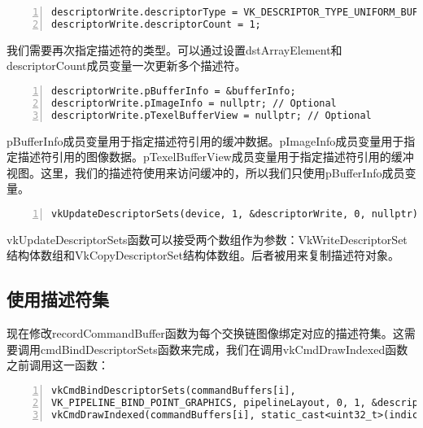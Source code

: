 \documentclass{ctexart}
\begin{document}
\begin{lstlisting}[language={[ANSI]C},keywordstyle=\color{blue!70},commentstyle=\color{red!50!green!50!blue!50},frame=shadowbox, rulesepcolor=\color{red!20!green!20!blue!20},basicstyle=\small,numbers=left, numberstyle=\tiny,breaklines=true]
descriptorWrite.descriptorType = VK_DESCRIPTOR_TYPE_UNIFORM_BUFFER;
descriptorWrite.descriptorCount = 1;
\end{lstlisting}

我们需要再次指定描述符的类型。可以通过设置dstArrayElement和descriptorCount成员变量一次更新多个描述符。

\begin{lstlisting}[language={[ANSI]C},keywordstyle=\color{blue!70},commentstyle=\color{red!50!green!50!blue!50},frame=shadowbox, rulesepcolor=\color{red!20!green!20!blue!20},basicstyle=\small,numbers=left, numberstyle=\tiny,breaklines=true]
descriptorWrite.pBufferInfo = &bufferInfo;
descriptorWrite.pImageInfo = nullptr; // Optional
descriptorWrite.pTexelBufferView = nullptr; // Optional
\end{lstlisting}

pBufferInfo成员变量用于指定描述符引用的缓冲数据。pImageInfo成员变量用于指定描述符引用的图像数据。pTexelBufferView成员变量用于指定描述符引用的缓冲视图。这里，我们的描述符使用来访问缓冲的，所以我们只使用pBufferInfo成员变量。

\begin{lstlisting}[language={[ANSI]C},keywordstyle=\color{blue!70},commentstyle=\color{red!50!green!50!blue!50},frame=shadowbox, rulesepcolor=\color{red!20!green!20!blue!20},basicstyle=\small,numbers=left, numberstyle=\tiny,breaklines=true]
vkUpdateDescriptorSets(device, 1, &descriptorWrite, 0, nullptr);
\end{lstlisting}

vkUpdateDescriptorSets函数可以接受两个数组作为参数：VkWriteDescriptorSet结构体数组和VkCopyDescriptorSet结构体数组。后者被用来复制描述符对象。

\subsection{使用描述符集}

现在修改recordCommandBuffer函数为每个交换链图像绑定对应的描述符集。这需要调用cmdBindDescriptorSets函数来完成，我们在调用vkCmdDrawIndexed函数之前调用这一函数：

\begin{lstlisting}[language={[ANSI]C},keywordstyle=\color{blue!70},commentstyle=\color{red!50!green!50!blue!50},frame=shadowbox, rulesepcolor=\color{red!20!green!20!blue!20},basicstyle=\small,numbers=left, numberstyle=\tiny,breaklines=true]
vkCmdBindDescriptorSets(commandBuffers[i],
VK_PIPELINE_BIND_POINT_GRAPHICS, pipelineLayout, 0, 1, &descriptorSets[i], 0, nullptr);
vkCmdDrawIndexed(commandBuffers[i], static_cast<uint32_t>(indices.size()), 1, 0, 0, 0);
\end{lstlisting}
\end{document}
